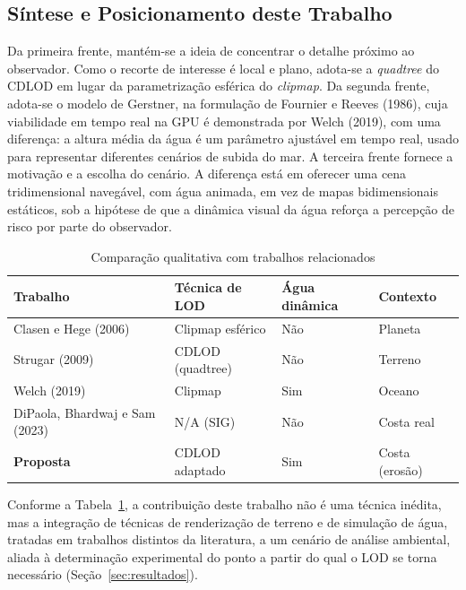 \documentclass[conference]{IEEEtran}
\newcommand{\fonte}[1]{\par\vspace{2pt}{\footnotesize Fonte: #1\par}}
\begin{document}
\subsection{Síntese e Posicionamento deste Trabalho}
\label{sub:sintese}

Da primeira frente, mantém-se a ideia de concentrar o detalhe próximo ao
observador. Como o recorte de interesse é local e plano, adota-se a
\emph{quadtree} do CDLOD em lugar da parametrização esférica do
\emph{clipmap}. Da segunda frente, adota-se o modelo de Gerstner, na
formulação de Fournier e Reeves (1986), cuja viabilidade em tempo real na GPU é demonstrada por Welch
(2019), com uma diferença: a altura média
da água é um parâmetro ajustável em tempo real, usado para representar
diferentes cenários de subida do mar. A terceira frente fornece a motivação
e a escolha do cenário. A diferença está em oferecer uma cena
tridimensional navegável, com água animada, em vez de mapas bidimensionais
estáticos, sob a hipótese de que a dinâmica visual da água reforça a
percepção de risco por parte do observador.

\begin{table}[t]
\caption{Comparação qualitativa com trabalhos relacionados}
\label{tab:comparacao}
\centering
\begin{tabular}{@{}p{2.5cm}p{2.0cm}p{1.6cm}p{1.5cm}@{}}
\toprule
\textbf{Trabalho} & \textbf{Técnica de LOD} & \textbf{Água dinâmica} & \textbf{Contexto} \\
\midrule
Clasen e Hege (2006) & Clipmap esférico & Não & Planeta \\
Strugar (2009) & CDLOD (quadtree) & Não & Terreno \\
Welch (2019) & Clipmap & Sim & Oceano \\
DiPaola, Bhardwaj e Sam (2023) & N/A (SIG) & Não & Costa real \\
\textbf{Proposta} & CDLOD adaptado & Sim & Costa (erosão) \\
\bottomrule
\end{tabular}
\fonte{Elaborado pelos autores (2026).}
\end{table}

Conforme a Tabela~\ref{tab:comparacao}, a contribuição deste trabalho não é
uma técnica inédita, mas a integração de técnicas de renderização de
terreno e de simulação de água, tratadas em trabalhos distintos da literatura, a um cenário de análise ambiental, aliada à
determinação experimental do ponto a partir do qual o LOD se torna
necessário (Seção~\ref{sec:resultados}).
\end{document}
